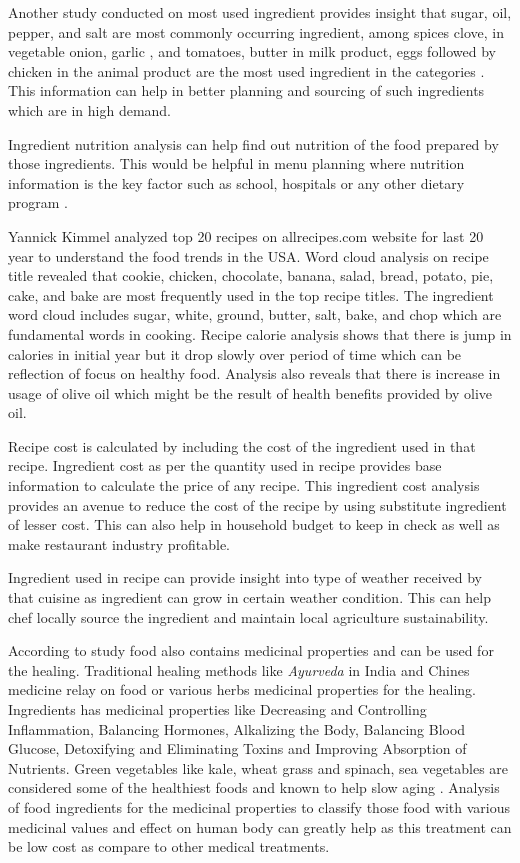 \documentclass[sigconf]{acmart}
\begin{document}
Another study conducted on most used ingredient provides insight that sugar, oil, pepper, and salt are most commonly occurring ingredient, among spices clove, in vegetable onion,  garlic , and tomatoes, butter in milk product, eggs followed by chicken in the animal product are the most used ingredient in the categories \cite{Chatterjee2016}. This information can help in better planning and sourcing of such ingredients which are in high demand.

Ingredient nutrition analysis can help find out nutrition of the food prepared by those ingredients. This would be helpful in menu planning where nutrition information is the key factor such as school, hospitals or any other dietary program \cite{www-onlinelibrary}.

Yannick Kimmel \cite{www-nyc} analyzed top 20 recipes on allrecipes.com website for last 20 year to understand the food trends in the USA. Word cloud analysis on recipe title revealed that cookie, chicken, chocolate, banana, salad, bread, potato, pie, cake, and bake are most frequently used in the top recipe titles. The ingredient word cloud includes sugar, white, ground, butter, salt, bake, and chop which are fundamental words in cooking. Recipe calorie analysis shows that there is jump in calories in initial year but it drop slowly over period of time which can be reflection of focus on healthy food. Analysis also reveals that there is increase in usage of olive oil which might be the result of health benefits provided by olive oil.

Recipe cost is calculated by including the cost of the ingredient used in that recipe. Ingredient cost as per the quantity used in recipe provides base information to calculate the price of any recipe. This ingredient cost analysis provides an avenue to reduce the cost of the recipe by using substitute ingredient of lesser cost. This can also help in household budget to keep in check as well as make restaurant industry profitable.

Ingredient used in recipe can provide insight into type of weather received by that cuisine as ingredient can grow in certain weather condition. This can help chef locally source the ingredient and maintain local agriculture sustainability.

According to study food also contains medicinal properties and can be used for the healing. Traditional healing methods like \emph{Ayurveda} in India and Chines medicine relay on food or various herbs medicinal properties for the healing. Ingredients has medicinal properties like Decreasing and Controlling Inflammation, Balancing Hormones,  Alkalizing the Body, Balancing Blood Glucose, Detoxifying and Eliminating Toxins and Improving Absorption of Nutrients. Green vegetables like kale, wheat grass and spinach, sea vegetables are considered some of the healthiest foods and known to help slow aging \cite{draxe}. Analysis of food ingredients for the medicinal properties to classify those food with various medicinal values and effect on human body can greatly help as this treatment can be low cost as compare to other medical treatments.
\end{document}
